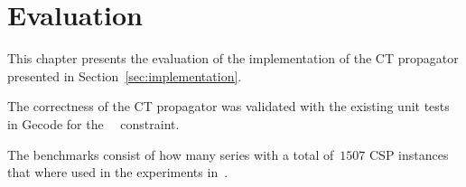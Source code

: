 \documentclass[a4paper,11pt]{article}
\newcommand{\Todo}[1]{{\color{blue}#1}}
\newcommand{\Secref}[1]{Section~\ref{#1}}
\newcommand{\Chapref}[1]{Section~\ref{#1}}
\newcommand{\Table}{\Constraint{Table}~}
\newcommand{\Supports}{\texttt{supports}}
\newcommand{\Residues}{\texttt{residues}}
\newcommand{\CTpaper}[0]{DBLP:conf/cp/DemeulenaereHLP16}
\numberwithin{equation}{section}
\begin{document}










\section{Evaluation}
\label{evaluation}

This chapter presents the evaluation of the implementation of the CT propagator
presented in \Chapref{sec:implementation}. 

\label{evaluation:setup}
The correctness of the CT propagator was validated with the existing unit tests
in Gecode for the \Table~constraint.

The benchmarks consist of \Todo{how many} series 
with a total of~$1507$ CSP instances that where used in the
experiments in~\cite{\CTpaper}.
\end{document}
